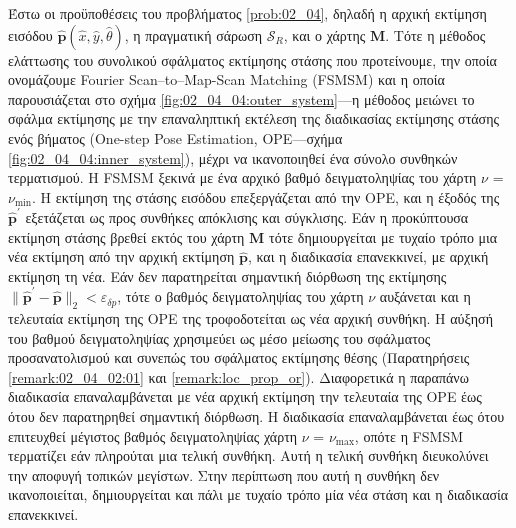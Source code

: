 Έστω οι προϋποθέσεις του προβλήματος \ref{prob:02_04}, δηλαδή η αρχική εκτίμηση
εισόδου $\hat{\bm{p}}(\hat{x}, \hat{y}, \hat{\theta})$, η πραγματική σάρωση
$\mathcal{S}_R$, και ο χάρτης $\bm{M}$. Τότε η μέθοδος ελάττωσης του συνολικού
σφάλματος εκτίμησης στάσης που προτείνουμε, την οποία ονομάζουμε Fourier
Scan--to--Map-Scan Matching (FSMSM) και η οποία παρουσιάζεται στο σχήμα
\ref{fig:02_04_04:outer_system}---η μέθοδος μειώνει το σφάλμα εκτίμησης με την
επαναληπτική εκτέλεση της διαδικασίας εκτίμησης στάσης ενός βήματος (One-step
Pose Estimation, OPE---σχήμα \ref{fig:02_04_04:inner_system}), μέχρι να
ικανοποιηθεί ένα σύνολο συνθηκών τερματισμού. Η FSMSM ξεκινά με ένα αρχικό
βαθμό δειγματοληψίας του χάρτη $\nu$ = $\nu_{\min}$. Η εκτίμηση της στάσης
εισόδου επεξεργάζεται από την OPE, και η έξοδός της $\hat{\bm{p}}^\prime$
εξετάζεται ως προς συνθήκες απόκλισης και σύγκλισης. Εάν η προκύπτουσα εκτίμηση
στάσης βρεθεί εκτός του χάρτη $\bm{M}$ τότε δημιουργείται με τυχαίο τρόπο μια
νέα εκτίμηση από την αρχική εκτίμηση $\hat{\bm{p}}$, και η διαδικασία
επανεκκινεί, με αρχική εκτίμηση τη νέα. Εάν δεν παρατηρείται σημαντική διόρθωση
της εκτίμησης $\|\hat{\bm{p}}^\prime-\hat{\bm{p}}\|_2 < \varepsilon_{\delta
p}$, τότε ο βαθμός δειγματοληψίας του χάρτη $\nu$ αυξάνεται και η τελευταία
εκτίμηση της OPE της τροφοδοτείται ως νέα αρχική συνθήκη. Η αύξησή του βαθμού
δειγματοληψίας χρησιμεύει ως μέσο μείωσης του σφάλματος προσανατολισμού και
συνεπώς του σφάλματος εκτίμησης θέσης (Παρατηρήσεις \ref{remark:02_04_02:01}
και \ref{remark:loc_prop_or}). Διαφορετικά η παραπάνω διαδικασία
επαναλαμβάνεται με νέα αρχική εκτίμηση την τελευταία της OPE έως ότου δεν
παρατηρηθεί σημαντική διόρθωση. Η διαδικασία επαναλαμβάνεται έως ότου
επιτευχθεί μέγιστος βαθμός δειγματοληψίας χάρτη $\nu$ = $\nu_{\max}$, οπότε η
FSMSM τερματίζει εάν πληρούται μια τελική συνθήκη. Αυτή η τελική συνθήκη
διευκολύνει την αποφυγή τοπικών μεγίστων. Στην περίπτωση που αυτή η συνθήκη δεν
ικανοποιείται, δημιουργείται και πάλι με τυχαίο τρόπο μία νέα στάση και η
διαδικασία επανεκκινεί.


